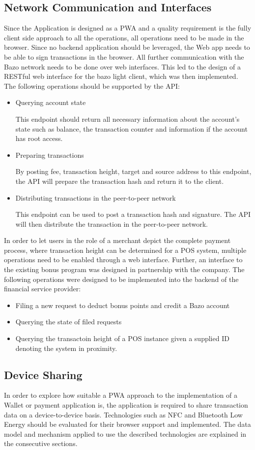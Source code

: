 \subsection{Network Communication and Interfaces}\label{networkandinterfaces}
Since the Application is designed as a PWA and a quality requirement is the fully client side approach to all the operations, all operations need to be made in the browser. Since no backend application should be leveraged, the Web app needs to be able to sign transactions in the browser. All further communication with the Bazo network needs to be done over web interfaces. This led to the design of a RESTful web interface for the bazo light client, which was then implemented. The following operations should be supported by the API:
\begin{itemize}
\item Querying account state

This endpoint should return all necessary information about the account's state such as balance, the transaction counter and information if the account has root access.
\item Preparing transactions

By posting fee, transaction height, target and source address to this endpoint, the API will prepare the transaction hash and return it to the client.
\item Distributing transactions in the peer-to-peer network

This endpoint can be used to post a transaction hash and signature. The API will then distribute the transaction in the peer-to-peer network.
\end{itemize}
In order to let users in the role of a merchant depict the complete payment process, where transaction height can be determined for a POS system, multiple operations need to be enabled through a web interface. Further, an interface to the existing bonus program was designed in partnership with the company. The following operations were designed to be implemented into the backend of the financial service provider:
\begin{itemize}
\item Filing a new request to deduct bonus points and credit a Bazo account
\item Querying the state of filed requests
\item Querying the transactoin height of a POS instance given a supplied ID denoting the system in proximity.
\end{itemize}
\subsection{Device Sharing}
In order to explore how suitable a PWA approach to the implementation of a Wallet or payment application is, the application is required to share transaction data on a device-to-device basis. Technologies such as NFC and Bluetooth Low Energy should be evaluated for their browser support and implemented. 
The data model and mechanism applied to use the described technologies are explained in the consecutive sections.
